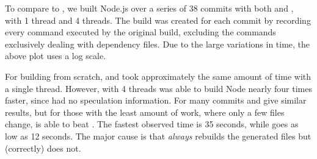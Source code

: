 


\vspace{3mm}

To compare to \Rattle, we built Node.js over a series of 38 commits with both \Make and \Rattle, with 1 thread and 4 threads. The \Rattle build was created for each commit by recording every command executed by the original build, excluding the commands exclusively dealing with dependency files. Due to the large variations in time, the above plot uses a log scale.

For building from scratch, \Make and \Rattle took approximately the same amount of time with a single thread. However, with 4 threads \Make was able to build Node nearly four times faster, since \Rattle had no speculation information. For many commits \Rattle and \Make give similar results, but for those with the least amount of work, where only a few files change, \Rattle is able to beat \Make. The fastest observed \Make time is 35 seconds, while \Rattle goes as low as 12 seconds. The major cause is that \Make \emph{always} rebuilds the generated files but \Rattle (correctly) does not.



